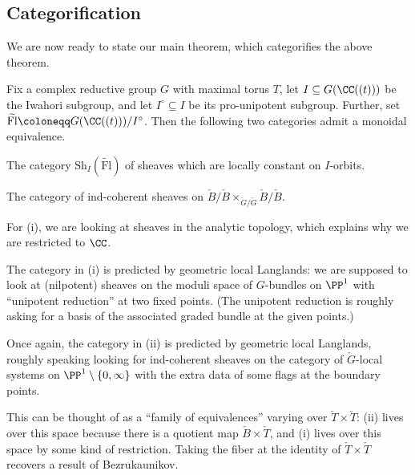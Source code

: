 \documentclass{article}
\begin{document}
\subsection{Categorification}
We are now ready to state our main theorem, which categorifies the above theorem.
\begin{theorem}
	Fix a complex reductive group $G$ with maximal torus $T$, let $I\subseteq G(\CC((t)))$ be the Iwahori subgroup, and let $I^\circ\subseteq I$ be its pro-unipotent subgroup. Further, set $\widetilde{\mathrm{Fl}}\coloneqq G(\CC((t)))/I^\circ$. Then the following two categories admit a monoidal equivalence.
	\begin{listroman}
		\item The category $\mathrm{Sh}_I(\widetilde{\mathrm{Fl}})$ of sheaves which are locally constant on $I$-orbits.
		\item The category of ind-coherent sheaves on $\check B/\check B\times_{\check G/\check G}\check B/\check B$.
	\end{listroman}
\end{theorem}
\begin{remark}
	For (i), we are looking at sheaves in the analytic topology, which explains why we are restricted to $\CC$.
\end{remark}
\begin{remark}
	The category in (i) is predicted by geometric local Langlands: we are supposed to look at (nilpotent) sheaves on the moduli space of $G$-bundles on $\PP^1$ with ``unipotent reduction'' at two fixed points. (The unipotent reduction is roughly asking for a basis of the associated graded bundle at the given points.)
\end{remark}
\begin{remark}
	Once again, the category in (ii) is predicted by geometric local Langlands, roughly speaking looking for ind-coherent sheaves on the category of $\check G$-local systems on $\PP^1\setminus\{0,\infty\}$ with the extra data of some flags at the boundary points.
\end{remark}
\begin{remark}
	This can be thought of as a ``family of equivalences'' varying over $\check T\times\check T$: (ii) lives over this space because there is a quotient map $\check B\times\check T$, and (i) lives over this space by some kind of restriction. Taking the fiber at the identity of $\check T\times\check T$ recovers a result of Bezrukaunikov.
\end{remark}
\end{document}
